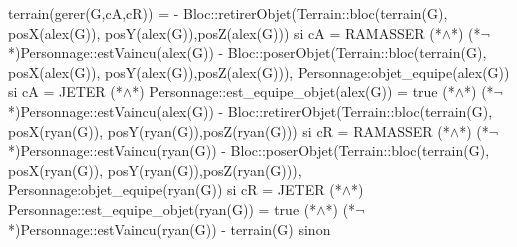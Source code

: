 \documentclass[a4paper, 11pt]{report}
\begin{document}
\begin{Spe}
	terrain(gerer(G,cA,cR)) = 
	- Bloc::retirerObjet(Terrain::bloc(terrain(G), posX(alex(G)), posY(alex(G)),posZ(alex(G))) 
		si cA = RAMASSER (*$\land$*) (*$\lnot$*)Personnage::estVaincu(alex(G)) 
	- Bloc::poserObjet(Terrain::bloc(terrain(G), posX(alex(G)), posY(alex(G)),posZ(alex(G))), Personnage:objet_equipe(alex(G)) 
		si cA = JETER (*$\land$*) Personnage::est_equipe_objet(alex(G)) = true (*$\land$*) (*$\lnot$*)Personnage::estVaincu(alex(G)) 
	- Bloc::retirerObjet(Terrain::bloc(terrain(G), posX(ryan(G)), posY(ryan(G)),posZ(ryan(G))) 
		si cR = RAMASSER (*$\land$*) (*$\lnot$*)Personnage::estVaincu(ryan(G)) 
	- Bloc::poserObjet(Terrain::bloc(terrain(G), posX(ryan(G)), posY(ryan(G)),posZ(ryan(G))), Personnage:objet_equipe(ryan(G)) 
		si cR = JETER (*$\land$*) Personnage::est_equipe_objet(ryan(G)) = true (*$\land$*) (*$\lnot$*)Personnage::estVaincu(ryan(G)) 
	- terrain(G) sinon 
	
	



\end{Spe}
\end{document}

